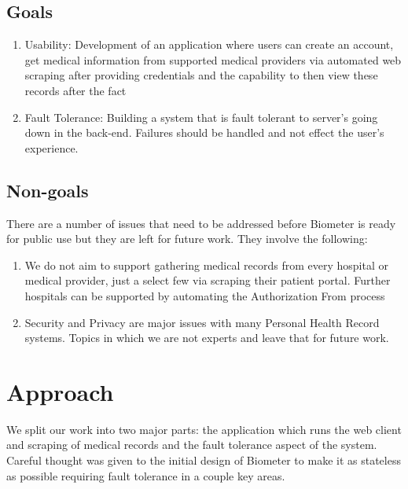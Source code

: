\documentclass{sig-alternate-nocopyright}
\begin{document}
\subsection{Goals}
\begin{enumerate}
\item{Usability: Development of an application where users can create an account, get medical information from supported medical providers via automated web scraping after providing credentials and the capability to then view these records after the fact}
\item{Fault Tolerance: Building a system that is fault tolerant to server's going down in the back-end. Failures should be handled and not effect the user's experience.}
\end{enumerate}
\subsection{Non-goals}
There are a number of issues that need to be addressed before Biometer is ready for public use but they are left for future work. They involve the following:
\begin{enumerate}
\item{We do not aim to support gathering medical records from every hospital or medical provider, just a select few via scraping their patient portal. Further hospitals can be supported by automating the Authorization From process}
\item{Security and Privacy are major issues with many Personal Health Record systems. Topics in which we are not experts and leave that for future work.}
\end{enumerate}

\section{Approach}
We split our work into two major parts: the application which runs the web client and scraping of medical records and the fault tolerance aspect of the system. Careful thought was given to the initial design of Biometer to make it as stateless as possible requiring fault tolerance in a couple key areas.
\end{document}
